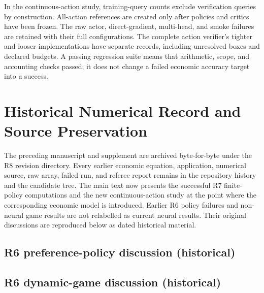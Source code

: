 In the continuous-action study, training-query counts exclude verification queries by construction. All-action references are created only after policies and critics have been frozen. The raw actor, direct-gradient, multi-head, and smoke failures are retained with their full configurations. The complete action verifier's tighter and looser implementations have separate records, including unresolved boxes and declared budgets. A passing regression suite means that arithmetic, scope, and accounting checks passed; it does not change a failed economic accuracy target into a success.


\section{Historical Numerical Record and Source Preservation}
The preceding manuscript and supplement are archived byte-for-byte under the R8 revision directory. Every earlier economic equation, application, numerical source, raw array, failed run, and referee report remains in the repository history and the candidate tree. The main text now presents the successful R7 finite-policy computations and the new continuous-action study at the point where the corresponding economic model is introduced. Earlier R6 policy failures and non-neural game results are not relabelled as current neural results. Their original discussions are reproduced below as dated historical material.
\subsection{R6 preference-policy discussion (historical)}

\subsection{R6 dynamic-game discussion (historical)}

